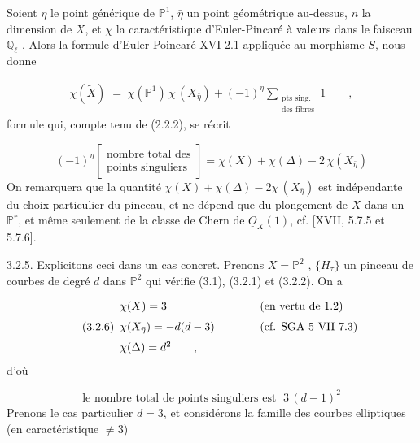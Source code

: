 Soient $\eta$ le point générique de $\mathbb{P}^1$, $\bar{\eta}$ un point géométrique au-dessus, $n$ la dimension de $X$, et $\chi$ la caractéristique d'Euler-Pincaré à valeurs dans le faisceau $\mathbb{Q}_\ell$ . Alors la formule d'Euler-Poincaré XVI 2.1 appliquée au morphisme $S$, nous donne

\begin{multline}\tag{3.2.3}
\chi(\widetilde{X}) \;=\; \chi(\mathbb{P}^1)\, \chi\,(X_{\bar{\eta}}) + (-1)^{\eta} \sum_{\substack{\text{pts sing.}\\ \text{des fibres}}} 1 \qquad ,
\end{multline}
formule qui, compte tenu de (2.2.2), se récrit

\begin{equation}\tag{3.2.4}
(-1)^{\eta} \left[\begin{array}{c} \text{nombre total des} \\[4pt] \text{points singuliers} \end{array}\right] = \chi(X) + \chi(\Delta) - 2\,\chi(X_{\bar{\eta}})
\end{equation}
On remarquera que la quantité $\chi(X) + \chi(\Delta) - 2\chi\,(X_{\bar{\eta}})$ est indépendante du choix particulier du pinceau, et ne dépend que du plongement de $X$ dans un $\mathbb{P}^r$, et même seulement de la classe de Chern de $\underline{O}_X(1)$, cf. [XVII, 5.7.5 et 5.7.6].



3.2.5. Explicitons ceci dans un cas concret. Prenons $X = \mathbb{P}^2$ , $\{H_\tau\}$ un pinceau de courbes de degré $d$ dans $\mathbb{P}^2$ qui vérifie (3.1), (3.2.1) et (3.2.2). On a

\begin{equation}\tag{3.2.6}
\begin{array}{l@{\qquad\qquad}l} \chi(X) = 3 & (\text{en vertu de 1.2}) \\[6pt] \chi(X_{\bar{\eta}}) = -d(d-3) & (\text{cf. SGA 5 VII 7.3}) \\[6pt] \chi(\Delta) = d^2 \qquad , & \end{array}
\end{equation}
d'où

\begin{equation}\tag{3.2.7}
\text{le nombre total de points singuliers est } \; 3\,(d-1)^2
\end{equation}
Prenons le cas particulier $d = 3$, et considérons la famille des courbes elliptiques (en caractéristique $\neq 3$)

